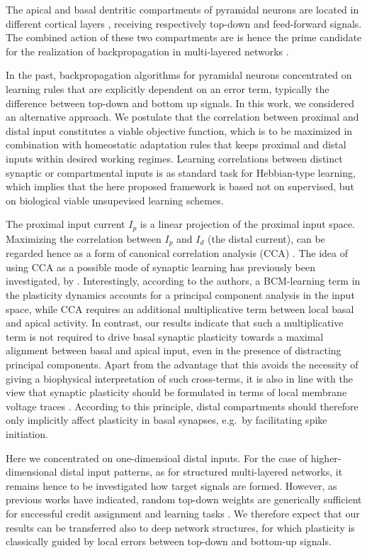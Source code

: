 \documentclass[utf8]{frontiersSCNS} %
\begin{document}
The apical and basal dentritic compartments of
pyramidal neurons are located in different
cortical layers \cite{park2019contribution},
receiving respectively top-down and feed-forward
signals. The combined action of these two
compartments are is hence the prime candidate
for the realization of backpropagation in 
multi-layered networks
\citep{Bengio2014,Lee2015,Guerguiev2017}. 

In the past, backpropagation algorithms 
for pyramidal neurons concentrated on 
learning rules that are explicitly dependent 
on an error term, typically the difference 
between top-down and bottom up signals.
In this work, we considered an alternative 
approach. We postulate that the correlation 
between proximal and distal input constitutes
a viable objective function, which is to be
maximized in combination with homeostatic 
adaptation rules that keeps proximal and 
distal inputs within desired working regimes.
Learning correlations between distinct
synaptic or compartmental inputs is
as standard task for Hebbian-type learning,
which implies that the here proposed framework
is based not on supervised, but on biological
viable unsupevised learning schemes.

The proximal input current $I_p$ is a linear 
projection of the proximal input space. 
Maximizing the correlation between $I_p$ and 
$I_d$ (the distal current), can be regarded 
hence as a form of canonical correlation
analysis (CCA) \citep{Haerdle2007}. The idea 
of using CCA as a possible mode of 
synaptic learning has previously been investigated,
by \citet{Haga2018}. Interestingly, according to 
the authors, a BCM-learning term in the plasticity 
dynamics accounts for a principal component analysis 
in the input space, while CCA requires an additional 
multiplicative term between local basal and apical 
activity. In contrast, our results indicate that 
such a multiplicative term is not required to drive 
basal synaptic plasticity towards a maximal alignment 
between basal and apical input, even in the presence 
of distracting principal components.
Apart from the advantage that this avoids the necessity 
of giving a biophysical interpretation of such cross-terms, 
it is also in line with the view that synaptic plasticity 
should be formulated in terms of local membrane voltage 
traces \citep{Clopath2010,Weissenberger2018}. 
According to this principle, distal compartments should 
therefore only implicitly affect plasticity in basal 
synapses, e.g.\ by facilitating spike initiation.

Here we concentrated on one-dimensioal distal inputs.
For the case of higher-dimensional distal input 
patterns, as for structured multi-layered networks,
it remains hence to be investigated how target signals 
are formed. However, as previous works have indicated, 
random top-down weights are generically sufficient 
for successful credit assignment and learning tasks
\citep{Lillicrap2016,Guerguiev2017}.
We therefore expect that our results can be
transferred also to deep network structures, 
for which plasticity is classically guided 
by local errors between top-down and bottom-up signals.
\end{document}
